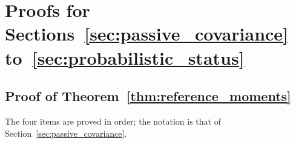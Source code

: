 \documentclass[twoside,11pt]{article}
\begin{document}

\section{Proofs for Sections~\ref{sec:passive_covariance} to~\ref{sec:probabilistic_status}}
\label{app:proofs_covariance}

\subsection{Proof of Theorem~\ref{thm:reference_moments}}
\label{app:proof_reference_moments}

The four items are proved in order; the notation is that of Section~\ref{sec:passive_covariance}.
\end{document}
